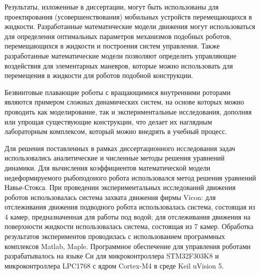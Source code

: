 {\influence} Результаты, изложенные в диссертации, могут быть использованы для проектирования (усовершенствования) мобильных устройств перемещающихся в жидкости. Разработанные математические модели движения могут использоваться для определения оптимальных параметров механизмов подобных роботов, перемещающихся в жидкости и построения систем управления. Также разработанные математические модели позволяют определить управляющие воздействия для элементарных маневров, которые можно использовать для перемещения в жидкости для роботов подобной конструкции.


Безвинтовые плавающие роботы с вращающимися внутренними роторами являются примером сложных динамических систем, на основе которых можно проводить как моделирование, так и экспериментальные исследования, дополняя или упрощая существующие конструкции, что делает их наглядным лабораторным комплексом, который можно внедрять в учебный процесс.

{\methods} Для решения поставленных в рамках диссертационного исследования задач использовались аналитические и численные методы решения уравнений динамики. Для вычисления коэффициентов математической модели недеформируемого рыбоподоного робота использовался метод решения уравнений Навье-Стокса. При проведении экспериментальных исследований движения роботов использовалась система захвата движения фирмы Vicon: для отслеживания движения подводного робота использовалась система, состоящая из 4 камер, предназначенная для работы под водой; для отслеживания движения на поверхности жидкости использовалась система, состоящая из 7 камер. Обработка результатов экспериментов проводилась с использованием программных комплексов Matlab, Maple. Программное обеспечение для управления роботами разрабатывалось на языке Си для микроконтроллера STM32F303K8 и микроконтроллера LPC1768 с ядром Cortex-M4 в среде Keil uVision 5.

